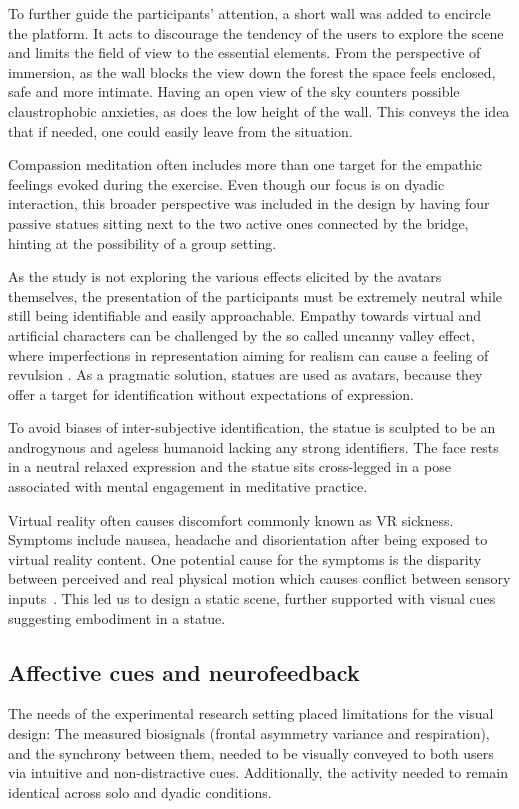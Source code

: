 \documentclass[manuscript, review = false, screen]{acmart}
\begin{document}
To further guide the participants' attention, a short wall was added to encircle the platform. It acts to discourage the tendency of the users to explore the scene and limits the field of view to the essential elements. From the perspective of immersion, as the wall blocks the view down the forest the space feels enclosed, safe and more intimate. Having an open view of the sky counters possible claustrophobic anxieties, as does the low height of the wall. This conveys the idea that if needed, one could easily leave from the situation.

Compassion meditation often includes more than one target for the empathic feelings evoked during the exercise. Even though our focus is on dyadic interaction, this broader perspective was included in the design by having four passive statues sitting next to the two active ones connected by the bridge, hinting at the possibility of a group setting. 

As the study is not exploring the various effects elicited by the avatars themselves, the presentation of the participants must be extremely neutral while still being identifiable and easily approachable. Empathy towards virtual and artificial characters can be challenged by the so called uncanny valley effect, where imperfections in representation aiming for realism can cause a feeling of revulsion \cite{6213238}. As a pragmatic solution, statues are used as avatars, because they offer a target for identification without expectations of expression.

To avoid biases of inter-subjective identification, the statue is sculpted to be an androgynous and ageless humanoid lacking any strong identifiers. The face rests in a neutral relaxed expression and the statue sits cross-legged in a pose associated with mental engagement in meditative practice.

Virtual reality often causes discomfort commonly known as VR sickness. Symptoms include nausea, headache and disorientation after being exposed to virtual reality content. One potential cause for the symptoms is the disparity between perceived and real physical motion which causes conflict between sensory inputs~\cite{LaViola:2000:DCV:333329.333344}. This led us to design a static scene, further supported with visual cues suggesting embodiment in a statue.

\subsection{Affective cues and neurofeedback}
The needs of the experimental research setting placed limitations for the visual design: The measured biosignals (frontal asymmetry variance and respiration), and the synchrony between them, needed to be visually conveyed to both users via intuitive and non-distractive cues. Additionally, the activity needed to remain identical across solo and dyadic conditions.
\end{document}
